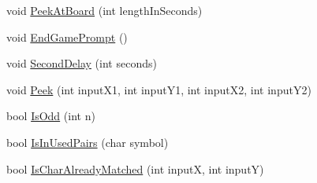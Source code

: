 \begin{DoxyCompactItemize}
\item 
void \hyperlink{classMemoryMatch_a56bf6c64798545d880f6d061464ae5a2}{Peek\-At\-Board} (int length\-In\-Seconds)
\item 
void \hyperlink{classMemoryMatch_a5a3232cd99dddddc6af5d5dc050087f7}{End\-Game\-Prompt} ()
\item 
void \hyperlink{classMemoryMatch_acfc3d904747668225bd52a508d9dcae6}{Second\-Delay} (int seconds)
\item 
void \hyperlink{classMemoryMatch_ae78665422f8d46d0c4639916f494845c}{Peek} (int input\-X1, int input\-Y1, int input\-X2, int input\-Y2)
\item 
bool \hyperlink{classMemoryMatch_a2cdc3fbc35524564a651e3cc1d5d03df}{Is\-Odd} (int n)
\item 
bool \hyperlink{classMemoryMatch_a7f3998ff0f59a063a493156c2d00eca2}{Is\-In\-Used\-Pairs} (char symbol)
\item 
bool \hyperlink{classMemoryMatch_acf4047dc2a34d4045a6a240253cb5600}{Is\-Char\-Already\-Matched} (int input\-X, int input\-Y)
\end{DoxyCompactItemize}
